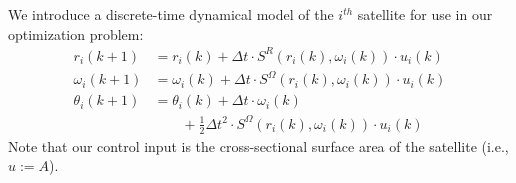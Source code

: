 \documentclass[letterpaper, 10 pt, conference]{ieeeconf}  %
\begin{document}
We introduce a discrete-time dynamical model of the $i^{th}$ satellite for use in our optimization problem:
\begin{subequations}
\begin{align}
r_i(k+1) &= r_i(k) + \Delta t \cdot S^{R}(r_i(k), \omega_i(k)) \cdot u_i(k) \\
\omega_i(k+1) &= \omega_i(k) + \Delta t \cdot S^{\Omega}(r_i(k), \omega_i(k)) \cdot u_i(k) \\
\theta_i(k+1) &= \theta_i(k) + \Delta t \cdot \omega_i(k) \\
                      & \ \ \ \ \ \ \ \ \ + \tfrac{1}{2} \Delta t^2 \cdot S^{\Omega}(r_i(k), \omega_i(k)) \cdot u_i(k) \nonumber
\end{align}
\label{eqn:discretemodels}%
\end{subequations}
Note that our control input is the cross-sectional surface area of the satellite (i.e., $u:=A$).
\iffalse
\begin{subequations}
\begin{align}\nonumber
S^{R}(\bar{r}_i(k), \bar{\omega}_i(k)) \ \ \ &\text{same as argument name}\\ \nonumber
S^{\Omega}(\bar{r}_i(k), \bar{\omega}_i(k)) \ \ \ &\text{same as argument name}\\ \nonumber
S^{1}(\bar{r}_i(k), \bar{\omega}_i(k)) \ \ \ &\text{confuse with raise to the power}\\ \nonumber
S^{2}(\bar{r}_i(k), \bar{\omega}_i(k)) \ \ \ &\text{confuse with raise to the power}\\ \nonumber
S(\bar{r}_i(k), \bar{\omega}_i(k)) \ \ \ &\text{too many other capital letters D, U, A}\\ \nonumber
R(\bar{r}_i(k), \bar{\omega}_i(k)) \ \ \ &\text{too many other capital letters D, U, A}\\ \nonumber
T(\bar{r}_i(k), \bar{\omega}_i(k)) \ \ \ &\text{confuse with time step T}\\ \nonumber
S^{R}(\bar{r}_i(k), \bar{\omega}_i(k)) \ \ \ &\text{I like it}\\ \nonumber
S^{\Omega}(\bar{r}_i(k), \bar{\omega}_i(k)) \ \ \ &\text{I like it}\\ \nonumber
S^{\rm rad}(\bar{r}_i(k), \bar{\omega}_i(k)) \ \ \ &\text{takes too much space}\\ \nonumber
S^{\rm tang}(\bar{r}_i(k), \bar{\omega}_i(k)) \ \ \ &\text{takes too much space}\\ \nonumber
S^{\rm radial}(\bar{r}_i(k), \bar{\omega}_i(k)) \ \ \ &\text{takes too much space}\\ \nonumber
S^{\rm tangential}(\bar{r}_i(k), \bar{\omega}_i(k)) \ \ \ &\text{takes too much space}\\ \nonumber
\end{align}
\end{subequations}
\fi
\end{document}
